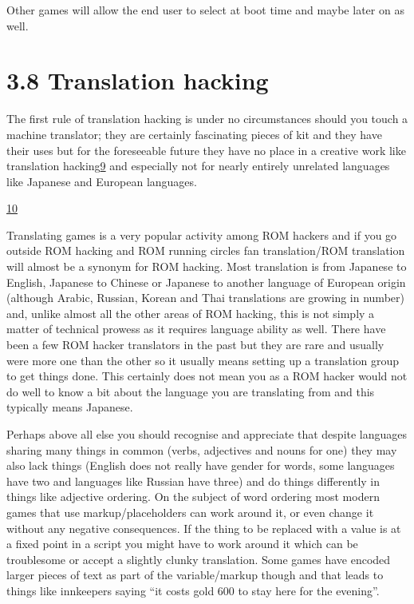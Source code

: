\documentclass[
]{book}
\begin{document}
Other games will allow the end user to select at boot time and maybe later on as well.

\hypertarget{translation-hacking}{%
\section{3.8 Translation hacking}\label{translation-hacking}}

The first rule of translation hacking is under no circumstances should you touch a machine translator; they are certainly fascinating pieces of kit and they have their uses but for the foreseeable future they have no place in a creative work like translation hacking\href{romhacking202010.html\#fn9x0}{9} and especially not for nearly entirely unrelated languages like Japanese and European languages.

\href{romhacking202011.html\#fn10x0}{10}

Translating games is a very popular activity among ROM hackers and if you go outside ROM hacking and ROM running circles fan translation/ROM translation will almost be a synonym for ROM hacking. Most translation is from Japanese to English, Japanese to Chinese or Japanese to another language of European origin (although Arabic, Russian, Korean and Thai translations are growing in number) and, unlike almost all the other areas of ROM hacking, this is not simply a matter of technical prowess as it requires language ability as well. There have been a few ROM hacker translators in the past but they are rare and usually were more one than the other so it usually means setting up a translation group to get things done. This certainly does not mean you as a ROM hacker would not do well to know a bit about the language you are translating from and this typically means Japanese.

Perhaps above all else you should recognise and appreciate that despite languages sharing many things in common (verbs, adjectives and nouns for one) they may also lack things (English does not really have gender for words, some languages have two and languages like Russian have three) and do things differently in things like adjective ordering. On the subject of word ordering most modern games that use markup/placeholders can work around it, or even change it without any negative consequences. If the thing to be replaced with a value is at a fixed point in a script you might have to work around it which can be troublesome or accept a slightly clunky translation. Some games have encoded larger pieces of text as part of the variable/markup though and that leads to things like innkeepers saying ``it costs gold 600 to stay here for the evening''.
\end{document}

